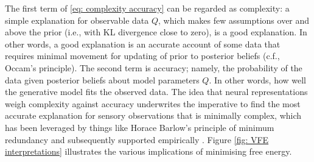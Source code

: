 \documentclass[review,12pt,authoryear]{elsarticle}
\begin{document}
The first term of \eqref{eq: complexity accuracy} can be regarded as complexity: a simple explanation for observable data $Q$, which makes few assumptions over and above the prior (i.e., with KL divergence close to zero), is a good explanation. In other words, a good explanation is an accurate account of some data that requires minimal movement for updating of prior to posterior beliefs (c.f., Occam's principle). The second term is accuracy; namely, the probability of the data given posterior beliefs about model parameters $Q$. In other words, how well the generative model fits the observed data. The idea that neural representations weigh complexity against accuracy underwrites the imperative to find the most accurate explanation for sensory observations that is minimally complex, which has been leveraged by things like Horace Barlow’s principle of minimum redundancy \citep{barlowRedundancyReductionRevisited2001} and subsequently supported empirically \citep{danEfficientCodingNatural1996,lewickiEfficientCodingNatural2002,olshausenSparseCodingSensory2004,olshausenNewWindowSound2002}. Figure \ref{fig: VFE interpretations} illustrates the various implications of minimising free energy.
\end{document}
